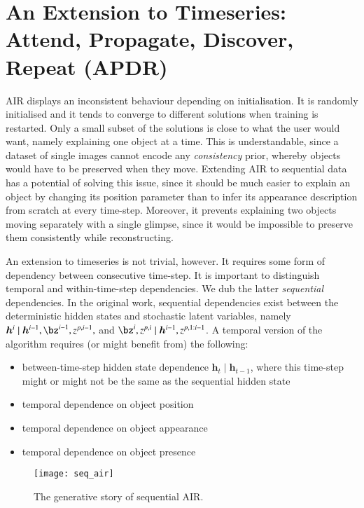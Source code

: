 \section{An Extension to Timeseries: Attend, Propagate, Discover, Repeat (APDR)}
AIR displays an inconsistent behaviour depending on initialisation. It is randomly initialised and it tends to converge to different solutions when training is restarted. Only a small subset of the solutions is close to what the user would want, namely explaining one object at a time. This is understandable, since a dataset of single images cannot encode any \emph{consistency} prior, whereby objects would have to be preserved when they move. Extending AIR to sequential data has a potential of solving this issue, since it should be much easier to explain an object by changing its position parameter than to infer its appearance description from scratch at every time-step. Moreover, it prevents explaining two objects moving separately with a single glimpse, since it would be impossible to preserve them consistently while reconstructing.

An extension to timeseries is not trivial, however. It requires some form of dependency between consecutive time-step. It is important to distinguish temporal and within-time-step dependencies. We dub the latter \emph{sequential} dependencies. In the original work, sequential dependencies exist between the deterministic hidden states and stochastic latent variables, namely $\bm{h}^i \mid \bm{h}^{i-1}, \bz^{i-1}, z^{p, i-1},$ and $\bz^i, z^{p, i} \mid \bm{h}^{i-1}, z^{p, 1:i-1}$. A temporal version of the algorithm requires (or might benefit from) the following:
\begin{itemize}
    \item between-time-step hidden state dependence \eg $\bm{h}_t \mid \bm{h}_{t-1}$, where this time-step might or might not be the same as the sequential hidden state
    \item temporal dependence on object position
    \item temporal dependence on object appearance
    \item temporal dependence on object presence
\end{itemize}

\begin{figure}
    \texttt{[image: seq\_air]}
    \caption{The generative story of sequential AIR.}
    \label{fig:seq_air}
\end{figure}

